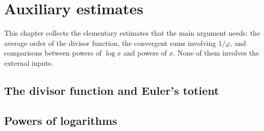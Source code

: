 \chapter{Auxiliary estimates}\label{ch:aux}

This chapter collects the elementary estimates that the main argument needs: the average order of
the divisor function, the convergent sums involving $1/\varphi$, and comparisons between powers of
$\log x$ and powers of $x$. None of them involves the external inputs.

\section{The divisor function and Euler's totient}




\section{Powers of logarithms}



